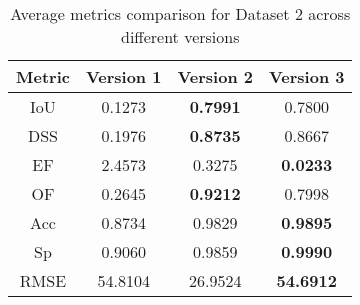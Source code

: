 \documentclass[12pt]{article}
\begin{document}
\begin{table}[h]
\centering
\begin{tabular}{|c|c|c|c|}
\hline
Metric & Version 1 & Version 2 & Version 3 \\
\hline
IoU & 0.1273 & \textbf{0.7991} & 0.7800 \\
DSS & 0.1976 & \textbf{0.8735} & 0.8667 \\
EF & 2.4573 & 0.3275 & \textbf{0.0233} \\
OF & 0.2645 & \textbf{0.9212} & 0.7998 \\
Acc & 0.8734 & 0.9829 & \textbf{0.9895} \\
Sp & 0.9060 & 0.9859 & \textbf{0.9990} \\
RMSE & 54.8104 & 26.9524 & \textbf{54.6912} \\
\hline
\end{tabular}
\caption{Average metrics comparison for Dataset 2 across different versions}
\end{table}
\end{document}
